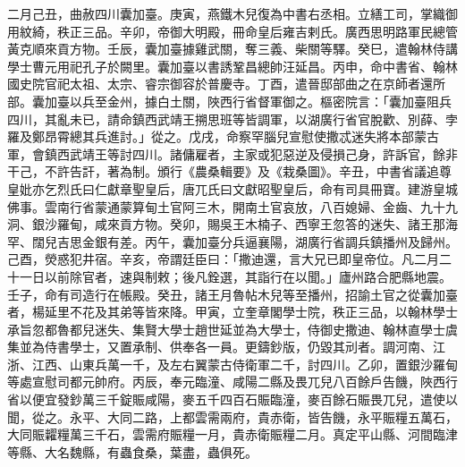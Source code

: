\begin{pinyinscope}
 二月己丑，曲赦四川囊加臺。庚寅，燕鐵木兒復為中書右丞相。立繕工司，掌織御用紋綺，秩正三品。辛卯，帝御大明殿，冊命皇后雍吉剌氏。廣西思明路軍民總管黃克順來貢方物。壬辰，囊加臺據雞武關，奪三義、柴關等驛。癸巳，遣翰林侍講學士曹元用祀孔子於闕里。囊加臺以書誘鞏昌總帥汪延昌。丙申，命中書省、翰林國史院官祀太祖、太宗、睿宗御容於普慶寺。丁酉，遣晉邸部曲之在京師者還所部。囊加臺以兵至金州，據白土關，陜西行省督軍御之。樞密院言：「囊加臺阻兵四川，其亂未已，請命鎮西武靖王搠思班等皆調軍，以湖廣行省官脫歡、別薛、孛羅及鄭昂霄總其兵進討。」從之。戊戌，命察罕腦兒宣慰使撒忒迷失將本部蒙古軍，會鎮西武靖王等討四川。諸傭雇者，主家或犯惡逆及侵損己身，許訴官，餘非干己，不許告訐，著為制。頒行《農桑輯要》及《栽桑圖》。辛丑，中書省議追尊皇妣亦乞烈氏曰仁獻章聖皇后，唐兀氏曰文獻昭聖皇后，命有司具冊寶。建游皇城佛事。雲南行省蒙通蒙算甸土官阿三木，開南土官哀放，八百媳婦、金齒、九十九洞、銀沙羅甸，咸來貢方物。癸卯，賜吳王木楠子、西寧王忽答的迷失、諸王那海罕、闊兒吉思金銀有差。丙午，囊加臺分兵逼襄陽，湖廣行省調兵鎮播州及歸州。己酉，熒惑犯井宿。辛亥，帝謂廷臣曰：「撒迪還，言大兄已即皇帝位。凡二月二十一日以前除官者，速與制敕；後凡銓選，其詣行在以聞。」廬州路合肥縣地震。壬子，命有司造行在帳殿。癸丑，諸王月魯帖木兒等至播州，招諭土官之從囊加臺者，楊延里不花及其弟等皆來降。甲寅，立奎章閣學士院，秩正三品，以翰林學士承旨忽都魯都兒迷失、集賢大學士趙世延並為大學士，侍御史撒迪、翰林直學士虞集並為侍書學士，又置承制、供奉各一員。更鑄鈔版，仍毀其刓者。調河南、江浙、江西、山東兵萬一千，及左右翼蒙古侍衛軍二千，討四川。乙卯，置銀沙羅甸等處宣慰司都元帥府。丙辰，奉元臨潼、咸陽二縣及畏兀兒八百餘戶告饑，陜西行省以便宜發鈔萬三千錠賑咸陽，麥五千四百石賑臨潼，麥百餘石賑畏兀兒，遣使以聞，從之。永平、大同二路，上都雲需兩府，貴赤衛，皆告饑，永平賑糧五萬石，大同賑糶糧萬三千石，雲需府賑糧一月，貴赤衛賑糧二月。真定平山縣、河間臨津等縣、大名魏縣，有蟲食桑，葉盡，蟲俱死。




\end{pinyinscope}
